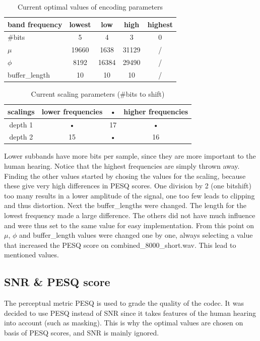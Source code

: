 \documentclass[a4paper]{article}
\begin{document}
\begin{table}[h]
\centering
\begin{tabular}{l|cccc} 
band frequency & lowest & low & high & highest \\ 
\hline 
\#bits & 5 & 4 & 3 & 0 \\ 
$\mu$ & 19660 & 1638 & 31129 & / \\  
$\phi$ & 8192 & 16384 & 29490 & / \\  
buffer\_length & 10 & 10 & 10 & / \\  
\hline 
\end{tabular}
\caption{Current optimal values of encoding parameters}
\label{tab:parametervalues}
\end{table}
\begin{table}[h]
\centering
\begin{tabular}{c|ccc}
scalings & lower frequencies & • &  higher frequencies \\ 
\hline 
depth 1 &  • & 17 & •  \\ 
depth 2 &  15 & • & 16  \\ 
\hline 
\end{tabular} 
\caption{Current scaling parameters (\#bits to shift)}
\label{tab:scalingparameters}
\end{table}
Lower subbands have more bits per sample, since they are more important to the human hearing. Notice that the highest frequencies are simply thrown away. Finding the other values started by chosing the values for the scaling, because these give very high differences in PESQ scores. One division by 2 (one bitshift) too many results in a lower amplitude of the signal, one too few leads to clipping and thus distortion. Next the buffer\_lengths were changed. The length for the lowest frequency made a large difference. The others did not have much influence and were thus set to the same value for easy implementation. From this point on $\mu$, $\phi$ and buffer\_length values were changed one by one, always selecting a value that increased the PESQ score on combined\_8000\_short.wav. This lead to mentioned values.

\subsection{SNR \& PESQ score}
The perceptual metric PESQ is used to grade the quality of the codec. It was decided to use PESQ instead of SNR since it takes features of the human hearing into account (such as masking). This is why the optimal values are chosen on basis of PESQ scores, and SNR is mainly ignored.
\end{document}

